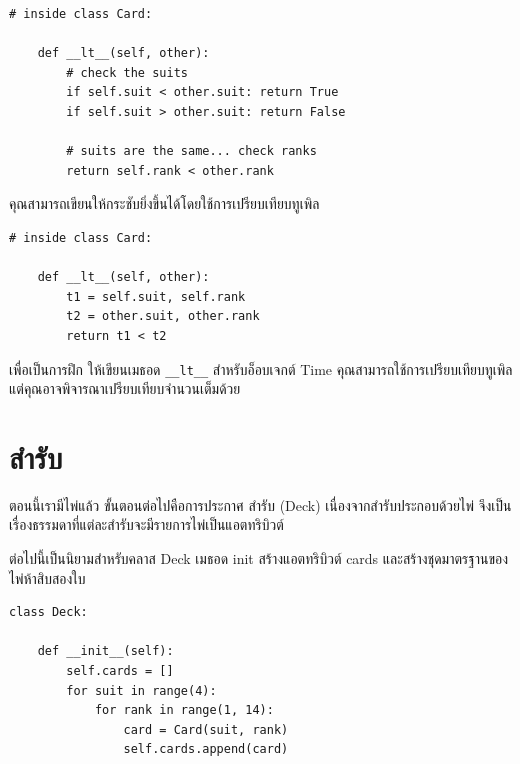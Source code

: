 \begin{verbatim}
# inside class Card:

    def __lt__(self, other):
        # check the suits
        if self.suit < other.suit: return True
        if self.suit > other.suit: return False

        # suits are the same... check ranks
        return self.rank < other.rank
\end{verbatim}
%
คุณสามารถเขียนให้กระชับยิ่งขึ้นได้โดยใช้การเปรียบเทียบทูเพิล

\begin{verbatim}
# inside class Card:

    def __lt__(self, other):
        t1 = self.suit, self.rank
        t2 = other.suit, other.rank
        return t1 < t2
\end{verbatim}
%
เพื่อเป็นการฝึก ให้เขียนเมธอด \verb"__lt__" สำหรับอ็อบเจกต์ Time คุณสามารถใช้การเปรียบเทียบทูเพิล แต่คุณอาจพิจารณาเปรียบเทียบจำนวนเต็มด้วย 

\section{สำรับ}

ตอนนี้เรามีไพ่แล้ว ขั้นตอนต่อไปคือการประกาศ สำรับ (Deck) เนื่องจากสำรับประกอบด้วยไพ่ จึงเป็นเรื่องธรรมดาที่แต่ละสำรับจะมีรายการไพ่เป็นแอตทริบิวต์ 

ต่อไปนี้เป็นนิยามสำหรับคลาส Deck เมธอด init สร้างแอตทริบิวต์ cards และสร้างชุดมาตรฐานของไพ่ห้าสิบสองใบ


\begin{verbatim}
class Deck:

    def __init__(self):
        self.cards = []
        for suit in range(4):
            for rank in range(1, 14):
                card = Card(suit, rank)
                self.cards.append(card)
\end{verbatim}
%

